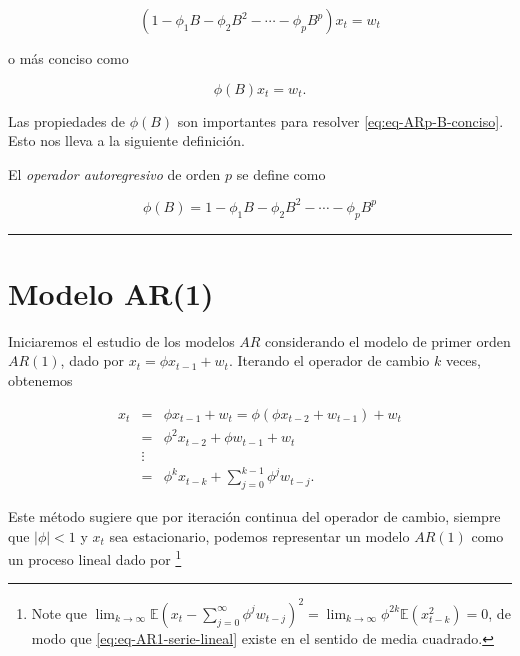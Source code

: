 \documentclass[12pt,]{krantz}
\theoremstyle{definition}
\theoremstyle{definition}
\theoremstyle{definition}
\theoremstyle{remark}
\let\BeginKnitrBlock\begin \let\EndKnitrBlock\end
\begin{document}
\begin{equation}
(1-\phi_1B-\phi_2B^2-\cdots-\phi_pB^p)x_t=w_t
\label{eq:eqARp-operador-B}
\end{equation}

o más conciso como

\begin{equation}
\phi(B)x_t=w_t.
\label{eq:eq-ARp-B-conciso}
\end{equation}

Las propiedades de \(\phi(B)\) son importantes para resolver
\eqref{eq:eq-ARp-B-conciso}. Esto nos lleva a la siguiente definición.

\BeginKnitrBlock{definition}
\protect\hypertarget{def:defi-operador-autoregresivo}{}{\label{def:defi-operador-autoregresivo}
}El \emph{operador autoregresivo} de orden \(p\) se define como

\begin{equation}
\phi(B) = 1-\phi_1B-\phi_2B^2-\cdots-\phi_pB^p
\label{eq:eq-operador-Bp}
\end{equation}
\EndKnitrBlock{definition}

\begin{center}\rule{0.5\linewidth}{\linethickness}\end{center}

\section{Modelo AR(1)}\label{modelo-ar1}

Iniciaremos el estudio de los modelos \(AR\) considerando el modelo de
primer orden \(AR(1)\), dado por \(x_t=\phi x_{t-1}+w_t\). Iterando el
operador de cambio \(k\) veces, obtenemos

\begin{eqnarray*}
x_t &=& \phi x_{t-1}+w_t = \phi(\phi x_{t-2}+w_{t-1})+w_t \\
    &=& \phi^2x_{t-2}+\phi w_{t-1}+w_t \\
    &\vdots& \\
    &=& \phi^kx_{t-k}+\sum_{j=0}^{k-1}\phi^jw_{t-j}.
\end{eqnarray*}

Este método sugiere que por iteración continua del operador de cambio,
siempre que \(|\phi|<1\) y \(x_t\) sea estacionario, podemos representar
un modelo \(AR(1)\) como un proceso lineal dado por \footnote{Note que
  \(\lim_{k\to\infty}\mathbb{E}(x_t-\sum_{j=0}^{\infty}\phi^jw_{t-j})^2 = \lim_{k\to\infty}\phi^{2k}\mathbb{E}(x_{t-k}^2)=0\),
  de modo que \eqref{eq:eq-AR1-serie-lineal} existe en el sentido de media
  cuadrado.}
\end{document}
